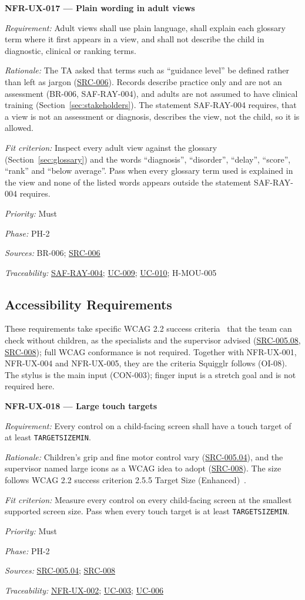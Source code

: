 \documentclass[12pt]{article}
\renewcommand{\_}{\textunderscore\allowbreak}%
\newcommand{\ucref}[1]{\hyperref[uc:#1]{\mbox{UC-#1}}}
\newenvironment{srsrequirement}[2]{%
  \par\medskip\noindent\phantomsection\label{req:#1}%
  \textbf{#1 --- #2}\par\nobreak\smallskip }{\par\medskip}
\newcommand{\reqfield}[2]{\noindent\textit{#1:} #2\par}
\newcommand{\reqshall}[1]{\reqfield{Requirement}{#1}}
\newcommand{\reqrationale}[1]{\reqfield{Rationale}{#1}}
\newcommand{\reqfit}[1]{\reqfield{Fit criterion}{#1}}
\newcommand{\reqpriority}[1]{\reqfield{Priority}{#1}}
\newcommand{\reqphase}[1]{\reqfield{Phase}{#1}}
\newcommand{\reqsources}[1]{\reqfield{Sources}{#1}}
\newcommand{\reqtraces}[1]{\reqfield{Traceability}{#1}}
\newcommand{\reqref}[1]{\hyperref[req:#1]{#1}}
\newcommand{\srcref}[1]{\hyperref[src:#1]{SRC-#1}}
\providecommand{\ucref}[1]{\hyperref[uc:#1]{UC-#1}}
\begin{document}
\begin{srsrequirement}{NFR-UX-017}{Plain wording in adult views}
  \reqshall{Adult views shall use plain language, shall explain each glossary
term where it first appears in a view, and shall not describe the child in
diagnostic, clinical or ranking terms.} \reqrationale{The TA asked that terms
such as ``guidance level'' be defined rather than left as jargon
(\srcref{006}). Records describe practice only and are not an assessment
(BR-006, SAF-RAY-004), and adults are not assumed to have clinical training
(Section~\ref{sec:stakeholders}). The statement SAF-RAY-004 requires, that a
view is not an assessment or diagnosis, describes the view, not the child, so
it is allowed.} \reqfit{Inspect every adult view against the glossary
(Section~\ref{sec:glossary}) and the words ``diagnosis'', ``disorder'',
``delay'', ``score'', ``rank'' and ``below average''. Pass when every glossary
term used is explained in the view and none of the listed words appears outside
the statement SAF-RAY-004 requires.}
  \reqpriority{Must}
  \reqphase{PH-2}
  \reqsources{BR-006; \srcref{006}} \reqtraces{\reqref{SAF-RAY-004};
  \ucref{009}; \ucref{010}; H-MOU-005}
\end{srsrequirement}

\subsection{Accessibility Requirements}
\label{sec:accessibility}

These requirements take specific WCAG 2.2 success criteria~\cite{wcag22} that
the team can check without children, as the specialists and the supervisor
advised (\srcref{005.08}, \srcref{008}); full WCAG conformance is not required.
Together with NFR-UX-001, NFR-UX-004 and NFR-UX-005, they are the criteria
Squigglr follows (OI-08). The stylus is the main input (CON-003); finger input
is a stretch goal and is not required here.

\begin{srsrequirement}{NFR-UX-018}{Large touch targets}
  \reqshall{Every control on a child-facing screen shall have a touch target of
at least \texttt{TARGET\_SIZE\_MIN}.} \reqrationale{Children's grip and fine
motor control vary (\srcref{005.04}), and the supervisor named large icons as a
WCAG idea to adopt (\srcref{008}). The size follows WCAG 2.2 success criterion
2.5.5 Target Size (Enhanced)~\cite{wcag22}.} \reqfit{Measure every control on
every child-facing screen at the smallest supported screen size. Pass when every
touch target is at least \texttt{TARGET\_SIZE\_MIN}.}
  \reqpriority{Must}
  \reqphase{PH-2}
  \reqsources{\srcref{005.04}; \srcref{008}} \reqtraces{\reqref{NFR-UX-002};
  \ucref{003}; \ucref{006}}
\end{srsrequirement}
\end{document}
